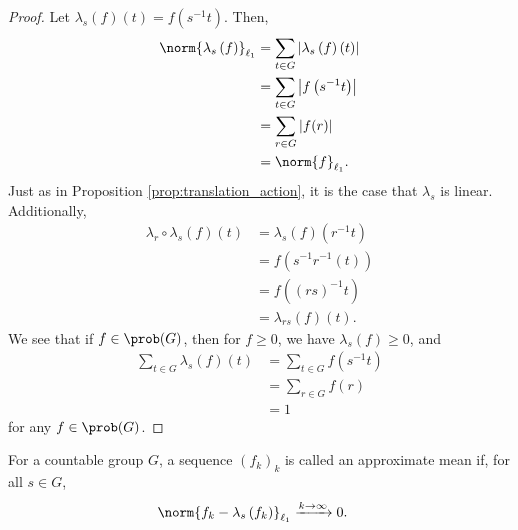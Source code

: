 \begin{proof}
  Let $\lambda_s\left(f\right)\left(t\right) = f\left(s^{-1}t\right)$. Then,
  \begin{align*}
    \norm{\lambda_s\left(f\right)}_{\ell_1} &= \sum_{t\in G}\left\vert \lambda_s\left(f\right)\left(t\right) \right\vert\\
                                     &= \sum_{t\in G}\left\vert f\left(s^{-1}t\right) \right\vert\\
                                     &= \sum_{r\in G}\left\vert f(r) \right\vert\\
                                     &= \norm{f}_{\ell_1}.
  \end{align*}
  Just as in Proposition \ref{prop:translation_action}, it is the case that $\lambda_s$ is linear. Additionally,
  \begin{align*}
    \lambda_r\circ \lambda_s\left(f\right)\left(t\right) &= \lambda_s\left(f\right)\left(r^{-1}t\right)\\
                                                         &= f\left(s^{-1}r^{-1}\left(t\right)\right)\\
                                                         &= f\left(\left(rs\right)^{-1}t\right)\\
                                                         &= \lambda_{rs}\left(f\right)\left(t\right).
  \end{align*}
  We see that if $f\in \prob(G)$, then for $f\geq 0$, we have $\lambda_s\left(f\right) \geq 0$, and
  \begin{align*}
    \sum_{t\in G}\lambda_s\left(f\right)\left(t\right) &= \sum_{t\in G}f\left(s^{-1}t\right)\\
                                                       &= \sum_{r\in G}f\left(r\right)\\
                                                       &= 1
  \end{align*}
  for any $f\in \prob(G)$.
\end{proof}
\begin{definition}\label{def:approximate_mean}
  For a countable group $G$, a sequence $\left(f_k\right)_k$ is called an approximate mean if, for all $s\in G$,
  \begin{align*}
    \norm{f_k - \lambda_s\left(f_k\right)}_{\ell_1} &\xrightarrow{k\rightarrow \infty}0.
  \end{align*}
\end{definition}
